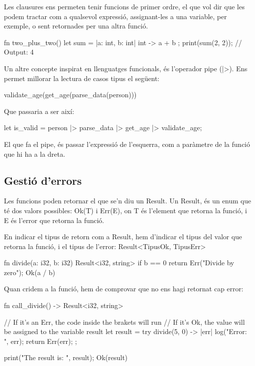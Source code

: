 ﻿\documentclass{article}
\begin{document}
Les clausures ens permeten tenir funcions de primer ordre, el que vol dir que
les podem tractar com a qualsevol expressió, assignant-les a una variable, per 
exemple, o sent retornades per una altra funció.

\begin{code}
fn two_plus_two() {
    let sum = |a: int, b: int| int -> {
        a + b
    };
    print(sum(2, 2)); // Output: 4
}
\end{code}

Un altre concepte inspirat en llenguatges funcionals, és l'operador pipe (|>). 
Ens permet millorar la lectura de casos tipus el següent:

\begin{code}
validate_age(get_age(parse_data(person)))
\end{code}

Que passaria a ser així:

\begin{code}
let is_valid = 
    person
    |> parse_data
    |> get_age
    |> validate_age;
\end{code}

El que fa el pipe, és passar l'expressió de l'esquerra, com a paràmetre de la
funció que hi ha a la dreta.

\subsection{Gestió d'errors}

Les funcions poden retornar el que se'n diu un Result. Un Result, és un enum
que té dos valors possibles: {\ttfamily Ok(T) i Err(E)}, on T és l'element que retorna la
funció, i E és l'error que retorna la funció.

En indicar el tipus de retorn com a Result, hem d'indicar el tipus del valor que
retorna la funció, i el tipus de l'error: {\ttfamily Result<TipusOk, TipusErr> }

\begin{code}
fn divide(a: i32, b: i32) Result<i32, string> {
    if b == 0 {
        return Err("Divide by zero");
    }
    Ok(a / b)
}
\end{code}

Quan cridem a la funció, hem de comprovar que no ens hagi retornat cap error:

\begin{code}
fn call_divide() -> Result<i32, string> {
    // If it's an Err, the code inside the brakets will run
    // If it's Ok, the value will be assigned to the variable result
    let result = try divide(5, 0) -> |err| {
        log("Error: ", err);
        return Err(err);
    };

    print("The result is: ", result);
    Ok(result)
}
\end{code}
\end{document}
